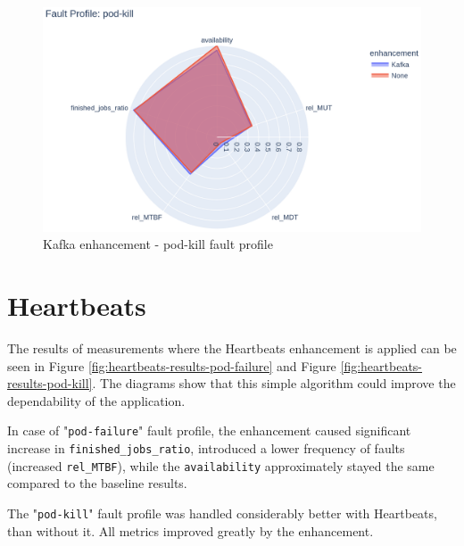 \begin{figure}[H]
	\centering
	\includegraphics[width=140mm, keepaspectratio]{figures/kafka_with_base_pod-kill.png}
	\caption{Kafka enhancement - pod-kill fault profile}
	\label{fig:kafka-results-pod-kill}
\end{figure}


\section{Heartbeats}

The results of measurements where the Heartbeats enhancement is applied can be seen in Figure \ref{fig:heartbeats-results-pod-failure} and Figure \ref{fig:heartbeats-results-pod-kill}. The diagrams show that this simple algorithm could improve the dependability of the application.

In case of "\texttt{pod-failure}" fault profile, the enhancement caused significant increase in \texttt{finished\_jobs\_ratio}, introduced a lower frequency of faults (increased \texttt{rel\_MTBF}), while the \texttt{availability} approximately stayed the same compared to the baseline results.

The "\texttt{pod-kill}" fault profile was handled considerably better with Heartbeats, than without it. All metrics improved greatly by the enhancement.

